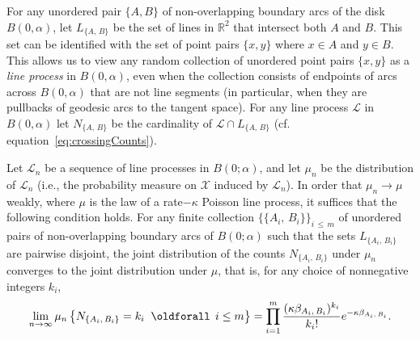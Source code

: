 \documentclass[10pt]{amsart}
\theoremstyle{definition}\newtheorem{defi}[theo]{Definition}\newtheorem{rema}[theo]{Remark}\newtheorem{exam}[theo]{Example}\newtheorem{exem}[theo]{Example}\newtheorem{nota}[theo]{Notation}
\newcommand{\zz}[1]{\mathbb #1}
\renewcommand*{\forall}{\mathrel{\oldforall}}
\begin{document}
For any unordered pair $\{A,B \}$ of non-overlapping boundary arcs of the disk $B (0,\alpha)$, let $L_{\{A,\,B \}}$ be the set of lines in $\zz{R}^{2}$ that intersect both $A$ and $B$. This set can be identified with the set of point pairs $\{x,y \}$ where $x\in A$ and $y\in B$. This allows us to view any random collection of unordered point pairs $\{x,y \}$ as a \emph{line process} in $B (0,\alpha)$, even when the collection consists of endpoints of arcs across $B (0,\alpha)$ that are not line segments (in particular, when they are pullbacks of geodesic arcs to the tangent space). For any line process $\mathcal{L}$ in $B (0,\alpha)$ let $N_{\{A,\,B \}}$ be the cardinality of $\mathcal{L}\cap L_{\{A,\,B \}}$ (cf. equation~\eqref{eq:crossingCounts}).

\begin{prop}\label{proposition:sufficientCondition}
Let $\mathcal{L}_{n}$ be a sequence of line processes in $B (0;\alpha)$, and let $\mu_{n}$ be the distribution of $\mathcal{L}_{n}$ (i.e., the probability measure on $\mathcal{X}$ induced by $\mathcal{L}_{n}$). In order that $\mu_{n}\rightarrow \mu$ weakly, where $\mu$ is the law of a rate$-\kappa$ Poisson line process, it suffices that the following condition holds. For any finite collection $\{\{ A_{i},\,B_{i}\} \}_{i\,\leq\,m}$ of unordered pairs of non-overlapping boundary arcs of $B(0;\alpha)$ such that the sets $L_{\{A_{i},\,B_{i} \}}$ are pairwise disjoint, the joint distribution of the counts $N_{\{ A_{i},\,B_{i}\}}$ under $\mu_{n}$ converges to the joint distribution under $\mu$, that is, for any choice of nonnegative integers $k_{i}$,
\begin{equation}\label{eq:suff-weak-convergence}
\lim_{n \rightarrow \infty} \mu_{n}\left\{N_{\{A_{i},\,B_{i} \}}=k_{i} \; \forall \,i\leq m\right\} =\prod_{i=1}^{m}
\frac{(\kappa \beta_{A_{i},\,B_{i}})^{k_{i}}}{k_{i}!} e^{-\kappa \beta_{A_{i},\,B_{i}}}.
\end{equation}
\end{prop}
\end{document}
